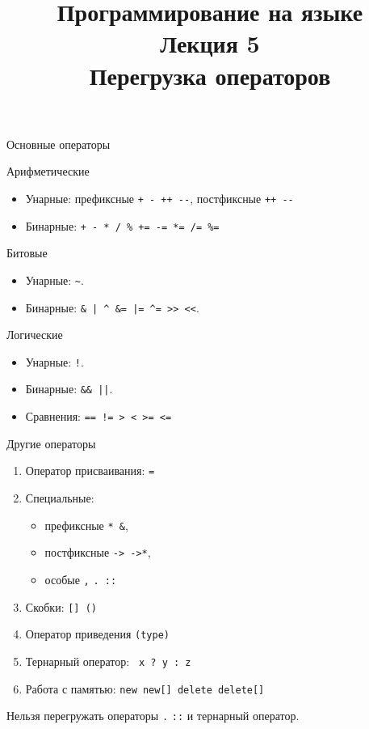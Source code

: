 \documentclass{beamer}
\title{{\bf Программирование на языке \langcpp\protect\\Лекция
5\protect\vspace{1em}\\}Перегрузка операторов}
\begin{document}
\begin{frame} 
  \titlepage
\end{frame}

\begin{frame}[fragile]{Основные операторы}
    \begin{block}{Арифметические}
        \begin{itemize}
            \item Унарные: префиксные {\color{blue}\verb!+ - ++ --!},
                постфиксные {\color{blue}\verb!++ --!}
            \item Бинарные: {\color{blue}\verb!+ - * / % += -= *= /= %=!}
        \end{itemize}
    \end{block}
    \begin{block}{Битовые}
        \begin{itemize}
            \item Унарные: {\color{blue}\verb!~!}.
            \item Бинарные: {\color{blue}\verb!& | ^ &= |= ^= >> <<!}.
        \end{itemize}
    \end{block}
    \begin{block}{Логические}
        \begin{itemize}
            \item Унарные: {\color{blue}\verb#!#}. 
            \item Бинарные: {\color{blue}\verb!&& ||!}.
            \item Сравнения: {\color{blue}\verb#== != > < >= <=#}
        \end{itemize}
    \end{block}
\end{frame}

\begin{frame}[fragile]{Другие операторы}
        \begin{enumerate}
            \item Оператор присваивания: {\color{blue}\verb!=!}
            \item Специальные: 
                \begin{itemize}
                    \item префиксные {\color{blue}\verb!* &!}, 
                    \item постфиксные  {\color{blue}\verb!-> ->*!}, 
                    \item особые {\color{blue}\verb!,! \verb!. ::!}
                \end{itemize}
            \item Скобки: {\color{blue}\verb![] ()!}
            \item Оператор приведения {\color{blue} \verb!(type)!}
            \item Тернарный оператор: {\color{blue}\verb! x ? y : z !}
            \item Работа с памятью: {\color{blue}\verb!new new[] delete delete[]!}
        \end{enumerate}

    Нельзя перегружать операторы {\color{blue}\verb!.! \verb!::!} и тернарный
    оператор.
\end{frame}
\end{document}
